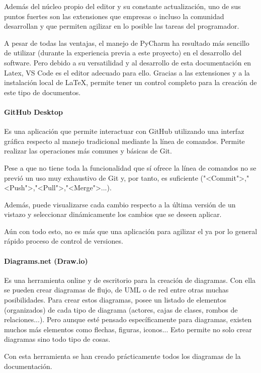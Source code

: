 Además del núcleo propio del editor y su constante actualización, uno de sus
puntos fuertes son las extensiones que empresas o incluso la comunidad
desarrollan y que permiten agilizar en lo posible las tareas del programador.

A pesar de todas las ventajas, el manejo de PyCharm ha resultado más sencillo de
utilizar (durante la experiencia previa a este proyecto) en el desarrollo del
software. Pero debido a su versatilidad y al desarrollo de esta documentación en
Latex, VS Code es el editor adecuado para ello. Gracias a las extensiones y a la
instalación local de \LaTeX, permite tener un control completo para la creación
de este tipo de documentos.

\paragraph{GitHub Desktop}
Es una aplicación que permite interactuar con GitHub utilizando una interfaz
gráfica respecto al manejo tradicional mediante la línea de comandos. Permite
realizar las operaciones más comunes y básicas de Git.

Pese a que no tiene toda la funcionalidad que sí ofrece la línea de comandos no
se previó un uso muy exhaustivo de Git y, por tanto, es suficiente
("<Commit">,"<Push">,"<Pull">,"<Merge">...).

Además, puede visualizarse cada cambio respecto a la última versión de un
vistazo y seleccionar dinámicamente los cambios que se deseen aplicar.

Aún con todo esto, no es más que una aplicación para agilizar el ya por lo
general rápido proceso de control de versiones.

\paragraph{Diagrams.net (Draw.io)}
Es una herramienta online y de escritorio para la creación de diagramas. Con
ella se pueden crear diagramas de flujo, de UML o de red entre otras muchas
posibilidades. Para crear estos diagramas, posee un listado de elementos
(organizados) de cada tipo de diagrama (actores, cajas de clases, rombos de
relaciones...). Pero aunque esté pensado específicamente para diagramas, existen
muchos más elementos como flechas, figuras, iconos... Esto permite no solo crear
diagramas sino todo tipo de cosas.

Con esta herramienta se han creado prácticamente todos los diagramas de la
documentación.

